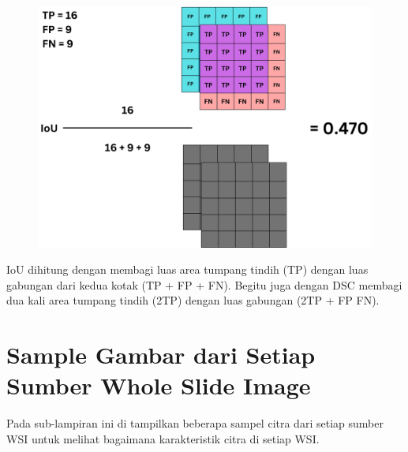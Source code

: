   \begin{figure}[H]
 	\centering
 	\includegraphics[scale=.2]{gambar/lampiran/IoU.png}
 \end{figure} 
 
 IoU dihitung dengan membagi luas area tumpang tindih (TP) dengan luas gabungan dari kedua kotak (TP + FP + FN). Begitu juga dengan DSC membagi dua kali area tumpang tindih (2TP) dengan luas gabungan (2TP + FP FN). 
 

\section{Sample Gambar dari Setiap Sumber Whole Slide Image}
\label{sec:sample_gambar}

Pada sub-lampiran ini di tampilkan beberapa sampel citra dari setiap sumber WSI untuk melihat bagaimana karakteristik citra di setiap WSI.

